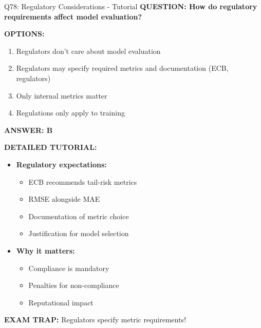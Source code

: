 \documentclass[8pt]{beamer}
\begin{document}
	\begin{frame}{Q78: Regulatory Considerations - Tutorial}
		\fontsize{6.5}{7.5}\selectfont
		\textbf{QUESTION: How do regulatory requirements affect model evaluation?}
		
		\vspace{0.1cm}
		\textbf{OPTIONS:}
		\begin{enumerate}
			\item Regulators don't care about model evaluation
			\item Regulators may specify required metrics and documentation (ECB, regulators)
			\item Only internal metrics matter
			\item Regulations only apply to training
		\end{enumerate}
		
		\vspace{0.1cm}
		\textcolor{myblue}{\textbf{ANSWER: B}}
		
		\vspace{0.1cm}
		\textbf{DETAILED TUTORIAL:}
		\begin{itemize}
			\item \textbf{Regulatory expectations:}
			\begin{itemize}
				\item ECB recommends tail-risk metrics
				\item RMSE alongside MAE
				\item Documentation of metric choice
				\item Justification for model selection
			\end{itemize}
			\item \textbf{Why it matters:}
			\begin{itemize}
				\item Compliance is mandatory
				\item Penalties for non-compliance
				\item Reputational impact
			\end{itemize}
		\end{itemize}
		
		\textcolor{myred}{\textbf{EXAM TRAP:}} Regulators \textcolor{myblue}{specify metric requirements}! 
	\end{frame}
\end{document}
